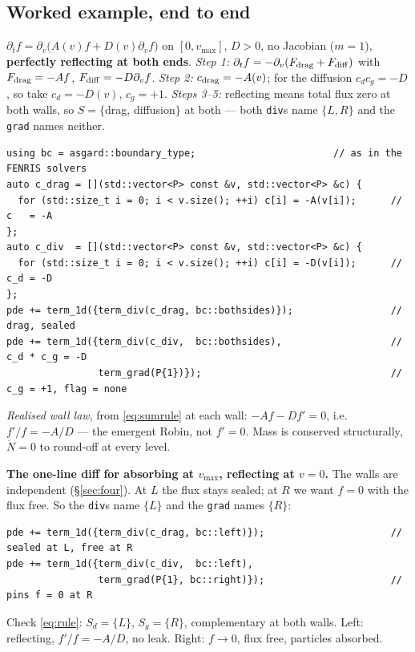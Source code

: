 \documentclass[10pt]{article}
\newcommand{\code}[1]{\texttt{#1}}
\begin{document}
\subsection{Worked example, end to end}
\label{sec:worked}

$\partial_tf=\partial_v\big(A(v)f+D(v)\partial_vf\big)$ on $[0,v_{\max}]$, $D>0$,
no Jacobian ($m=1$), \textbf{perfectly reflecting at both ends}.
\emph{Step 1:} $\partial_tf=-\partial_v(F_{\rm drag}+F_{\rm diff})$ with
$F_{\rm drag}=-Af$, $F_{\rm diff}=-D\partial_vf$. \emph{Step 2:}
$c_{\rm drag}=-A(v)$; for the diffusion $c_dc_g=-D$, so take $c_d=-D(v)$,
$c_g=+1$. \emph{Steps 3--5:} reflecting means total flux zero at both walls, so
$S=\{$drag, diffusion$\}$ at both --- both \code{div}s name $\{L,R\}$ and the
\code{grad} names neither.

\begin{lstlisting}
using bc = asgard::boundary_type;                        // as in the FENRIS solvers
auto c_drag = [](std::vector<P> const &v, std::vector<P> &c) {
  for (std::size_t i = 0; i < v.size(); ++i) c[i] = -A(v[i]);      // c   = -A
};
auto c_div  = [](std::vector<P> const &v, std::vector<P> &c) {
  for (std::size_t i = 0; i < v.size(); ++i) c[i] = -D(v[i]);      // c_d = -D
};
pde += term_1d({term_div(c_drag, bc::bothsides)});                 // drag, sealed
pde += term_1d({term_div(c_div,  bc::bothsides),                   // c_d * c_g = -D
                term_grad(P{1})});                                 // c_g = +1, flag = none
\end{lstlisting}
\emph{Realised wall law}, from \eqref{eq:sumrule} at each wall: $-Af-Df'=0$,
i.e.\ $f'/f=-A/D$ --- the emergent Robin, not $f'=0$. Mass is conserved
structurally, $\dot N=0$ to round-off at every level.

\textbf{The one-line diff for absorbing at $v_{\max}$, reflecting at $v=0$.} The
walls are independent (\S\ref{sec:four}). At $L$ the flux stays sealed; at $R$ we
want $f=0$ with the flux free. So the \code{div}s name $\{L\}$ and the
\code{grad} names $\{R\}$:
\begin{lstlisting}
pde += term_1d({term_div(c_drag, bc::left)});                      // sealed at L, free at R
pde += term_1d({term_div(c_div,  bc::left),
                term_grad(P{1}, bc::right)});                      // pins f = 0 at R
\end{lstlisting}
Check \eqref{eq:rule}: $S_d=\{L\}$, $S_g=\{R\}$, complementary at both walls.
Left: reflecting, $f'/f=-A/D$, no leak. Right: $f\to0$, flux free, particles
absorbed.
\end{document}
